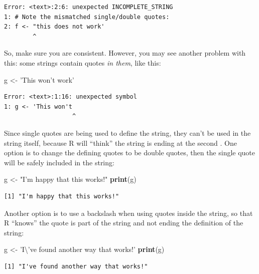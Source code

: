 \documentclass[
]{book}
\newenvironment{Shaded}{\begin{snugshade}}{\end{snugshade}}
\newcommand{\CharTok}[1]{\textcolor[rgb]{0.31,0.60,0.02}{#1}}
\newcommand{\KeywordTok}[1]{\textcolor[rgb]{0.13,0.29,0.53}{\textbf{#1}}}
\newcommand{\NormalTok}[1]{#1}
\newcommand{\StringTok}[1]{\textcolor[rgb]{0.31,0.60,0.02}{#1}}
\begin{document}
\begin{verbatim}
Error: <text>:2:6: unexpected INCOMPLETE_STRING
1: # Note the mismatched single/double quotes:
2: f <- "this does not work' 
        ^
\end{verbatim}

So, make sure you are consistent.
However, you may see another problem with this: some strings contain quotes \emph{in them}, like this:

\begin{Shaded}
\begin{Highlighting}[]
\NormalTok{g <-}\StringTok{ 'This won'}\NormalTok{t work}\StringTok{'}
\end{Highlighting}
\end{Shaded}

\begin{verbatim}
Error: <text>:1:16: unexpected symbol
1: g <- 'This won't
                   ^
\end{verbatim}

Since single quotes are being used to define the string, they can't be used in the string itself, because R will ``think'' the string is ending at the second \texttt{\textquotesingle{}}.
One option is to change the defining quotes to be double quotes, then the single quote will be safely included in the string:

\begin{Shaded}
\begin{Highlighting}[]
\NormalTok{g <-}\StringTok{ "I'm happy that this works!"}
\KeywordTok{print}\NormalTok{(g)}
\end{Highlighting}
\end{Shaded}

\begin{verbatim}
[1] "I'm happy that this works!"
\end{verbatim}

Another option is to use a backslash when using quotes inside the string, so that R ``knows'' the quote is part of the string and not ending the definition of the string:

\begin{Shaded}
\begin{Highlighting}[]
\NormalTok{g <-}\StringTok{ 'I}\CharTok{\textbackslash{}'}\StringTok{ve found another way that works!'}
\KeywordTok{print}\NormalTok{(g)}
\end{Highlighting}
\end{Shaded}

\begin{verbatim}
[1] "I've found another way that works!"
\end{verbatim}
\end{document}
